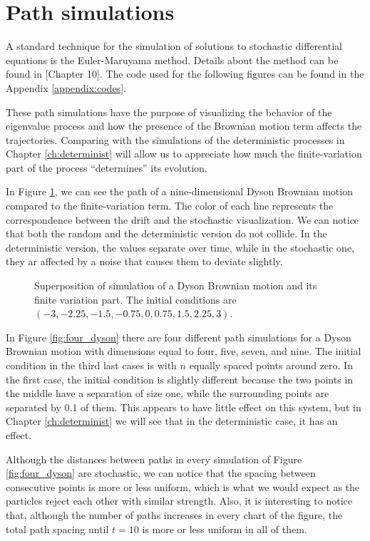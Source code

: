 \section{Path simulations}

A standard technique for the simulation of solutions to stochastic differential equations is the Euler-Maruyama method. Details about the method can be found in \cite{book:asmussen}[Chapter 10]. The code used for the following figures can be found in the Appendix \ref{appendix:codes}. 

These path simulations have the purpose of visualizing the behavior of the eigenvalue process and how the presence of the Brownian motion term affects the trajectories. Comparing with the simulations of the deterministic processes in Chapter \ref{ch:determinist} will allow us to appreciate how much the finite-variation part of the process ``determines'' its evolution.

In Figure \ref{fig:dyson_comparison}, we can see the path of a nine-dimensional Dyson Brownian motion compared to the finite-variation term. The color of each line represents the correspondence between the drift and the stochastic visualization. We can notice that both the random and the deterministic version do not collide. In the deterministic version, the values separate over time, while in the stochastic one, they ar affected by a noise that causes them to deviate slightly.

\begin{figure}[h!] \centering 
    
    \caption{Superposition of simulation of a Dyson Brownian motion and its finite variation part. The initial conditions are $(-3, -2.25, -1.5, -0.75, 0, 0.75, 1.5, 2.25, 3)$.\label{fig:dyson_comparison}}
\end{figure}

In Figure \ref{fig:four_dyson} there are four different path simulations for a Dyson Brownian motion with dimensions equal to four, five, seven, and nine. The initial condition in the third last cases is with $n$ equally spaced points around zero. In the first case, the initial condition is slightly different because the two points in the middle have a separation of size one, while the surrounding points are separated by 0.1 of them. This appears to have little effect on this system, but in Chapter \ref{ch:determinist} we will see that in the deterministic case, it has an effect.

Although the distances between paths in every simulation of Figure \ref{fig:four_dyson} are stochastic, we can notice that the spacing between consecutive points is more or less uniform, which is what we would expect as the particles reject each other with similar strength. Also, it is interesting to notice that, although the number of paths increases in every chart of the figure, the total path spacing until $t=10$ is more or less uniform in all of them. 

